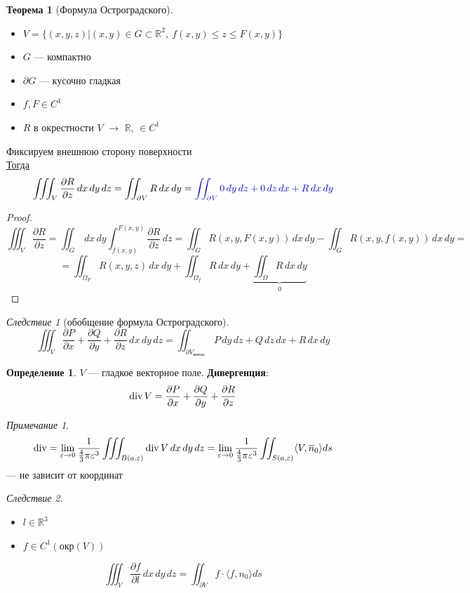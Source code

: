 \documentclass[oneside]{book}
\newcommand{\R}{\mathbb{R}}
\theoremstyle{plain}
\theoremstyle{remark}
\newtheorem*{remark}{Примечание}
\newtheorem{corollary}{Следствие}[theorem]
\theoremstyle{definition}
\newtheorem{theorem}{Теорема}[section]
\newtheorem*{definition}{Определение}
\begin{document}
\begin{theorem}[Формула Остроградского]
\-
\begin{itemize}
\item \(V = \{(x, y, z) \big| (x, y) \in G \subset \R^2,\ f(x, y) \le z \le F(x, y)\}\)
\item \(G\) --- компактно
\item \(\partial G\) --- кусочно гладкая
\item \(f, F \in C^1\)
\item \(R\) в окрестности \(V\) \(\to\) \(\R\), \(\in C^1\)
\end{itemize}
Фиксируем внешнюю сторону поверхности \\
\uline{Тогда}
\[ \iiint_V \frac{\partial R}{\partial z}\,dx\,dy\,dz = \iint_{\partial V}R\,dx\,dy = \color{blue} \iint_{\partial V} 0\,dy\,dz + 0\,dz\,dx + R\,dx\,dy \color{black} \]
\end{theorem}
\begin{proof}
\[ \iiint_V \frac{\partial R}{\partial z} = \iint_G \,dx\,dy \int_{f(x, y)}^{F(x, y)} \frac{\partial R}{\partial z}\,dz = \iint_G R(x, y, F(x, y))\,dx\,dy - \iint_G R(x, y, f(x, y)) \,dx\,dy =  \]
\[ = \iint_{\Omega_F} R(x, y, z)\,dx\,dy + \iint_{\Omega_f} R\,dx\,dy + \underbrace{\iint_{\Omega} R \,dx\,dy}_0 \]
\end{proof}
\begin{corollary}[обобщение формула Остроградского]
\[ \iiint_V \frac{\partial P}{\partial x} + \frac{\partial Q}{\partial y} + \frac{\partial R}{\partial z} \, dx\,dy\,dz = \iint_{\partial V_\text{внеш.}} P\,dy\,dz + Q\,dz\,dx + R\,dx\,dy\]
\end{corollary}
\begin{definition}
\(V\) --- гладкое векторное поле. \textbf{Дивергенция}:
\[ \mathop{\rm div}V = \frac{\partial P}{\partial x} + \frac{\partial Q}{\partial y} + \frac{\partial R}{\partial z} \]
\end{definition}
\begin{remark}
\[ \mathop{\rm div} = \lim_{\varepsilon \to 0} \frac{1}{\frac{4}{3}\pi\varepsilon^3} \iiint_{B(a, \varepsilon)} \mathop{\rm div} V \,dx\,dy\,dz  = \lim_{\varepsilon \to 0} \frac{1}{\frac{4}{3}\pi\varepsilon^3} \iint_{S(a, \varepsilon)} \langle V, \overline{n}_0 \rangle ds\]
--- не зависит от координат
\end{remark}
\begin{corollary}
\-
\begin{itemize}
\item \(l \in \R^3\)
\item \(f \in C^1(\text{окр}(V))\)
\end{itemize}
\[ \iiint_V \frac{\partial f}{\partial l} \,dx\,dy\,dz = \iint_{\partial V} f\cdot \langle f, n_0 \rangle ds \]
\end{corollary}
\end{document}
